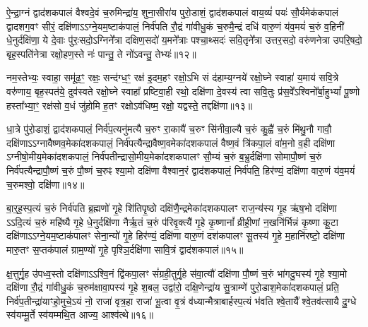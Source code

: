 {\anuvakamend[{सुभे॑षजमिहि॒ त्रीणि॑ च॥६॥}]}

ऐ॒न्द्रा॒ग्नं द्वाद॑शकपालं वैश्वदे॒वं च॒रुमिन्द्रा॑य॒ शुना॒सीरा॑य पुरो॒डाशं॒ द्वाद॑शकपालं वाय॒व्यं॑ पयः॑ सौ॒र्यमेक॑कपालं द्वादशग॒वꣳ सीरं॒ दक्षि॑णा\-ऽ\-ऽग्ने॒यम॒ष्टाक॑पालं॒ निर्व॑पति रौ॒द्रं गा॑वीधु॒कं च॒रुमै॒न्द्रं दधि॑ वारु॒णं य॑व॒मयं॑ च॒रुं व॒हिनी॑ धे॒नुर्दक्षि॑णा॒ ये दे॒वाः पु॑रः॒सदो॒\-ऽग्निने᳚त्रा दक्षिण॒सदो॑ य॒मने᳚त्राः पश्चा॒थ्सदः॑ सवि॒तृने᳚त्रा उत्तर॒सदो॒ वरु॑णनेत्रा उपरि॒षदो॒ बृह॒स्पति॑नेत्रा रक्षो॒हण॒स्ते नः॑ पान्तु॒ ते नो॑\-ऽवन्तु॒ तेभ्यः॑॥१२॥

नम॒स्तेभ्यः॒ स्वाहा॒ समू॑ढ॒ꣳ॒ रक्षः॒ सन्द॑ग्ध॒ꣳ॒ रक्ष॑ इ॒दम॒हꣳ रक्षो॒\-ऽभि सं द॑हाम्य॒ग्नये॑ रक्षो॒घ्ने स्वाहा॑ य॒माय॑ सवि॒त्रे वरु॑णाय॒ बृह॒स्पत॑ये॒ दुव॑स्वते रक्षो॒घ्ने स्वाहा᳚ प्रष्टिवा॒ही रथो॒ दक्षि॑णा दे॒वस्य॑ त्वा सवि॒तुः प्र॑स॒वे᳚\-ऽश्विनो᳚र्बा॒हु\-भ्यां᳚ पू॒ष्णो हस्ता᳚भ्या॒ꣳ॒ रक्ष॑सो व॒धं जु॑होमि ह॒तꣳ रक्षो\-ऽव॑धिष्म॒ रक्षो॒ यद्वस्ते॒ तद्दक्षि॑णा॥१३॥


{\anuvakamend[{तेभ्यः॒ पञ्च॑चत्वारिꣳशच्च॥७॥}]}

धा॒त्रे पु॑रो॒डाशं॒ द्वाद॑शकपालं॒ निर्व॑प॒त्यनु॑मत्यै च॒रुꣳ रा॒कायै॑ च॒रुꣳ सि॑नीवा॒ल्यै च॒रुं कु॒ह्वै॑ च॒रुं मि॑थु॒नौ गावौ॒ दक्षि॑णा\-ऽ\-ऽग्नावैष्णव॒मेका॑दशकपालं॒ निर्व॑पत्यैन्द्रावैष्ण॒वमेका॑दशकपालं वैष्ण॒वं त्रि॑कपा॒लं वा॑म॒नो व॒ही दक्षि॑णा \-ऽग्नीषो॒मीय॒मेका॑दशकपालं॒ निर्व॑पतीन्द्रासो॒मीय॒मेका॑दशकपालꣳ सौ॒म्यं च॒रुं ब॒भ्रुर्दक्षि॑णा सोमापौ॒ष्णं च॒रुं निर्व॑पत्यैन्द्रापौ॒ष्णं च॒रुं पौ॒ष्णं च॒रुꣴ श्या॒मो दक्षि॑णा वैश्वान॒रं द्वाद॑शकपालं॒ निर्व॑पति॒ हिर॑ण्यं॒ दक्षि॑णा वारु॒णं य॑व॒मयं॑ च॒रुमश्वो॒ दक्षि॑णा॥१४॥

{\anuvakamend[{निर॒ष्टौ च॥८॥}]}

बा॒र्॒\mbox{}ह॒स्प॒त्यं च॒रुं निर्व॑पति ब्र॒ह्मणो॑ गृ॒हे शि॑तिपृ॒ष्ठो दक्षि॑णै॒न्द्रमेका॑दशकपालꣳ राज॒न्य॑स्य गृ॒ह ऋ॑ष॒भो दक्षि॑णा \-ऽ\-ऽदि॒त्यं च॒रुं महि॑ष्यै गृ॒हे धे॒नुर्दक्षि॑णा नैर्\mbox{}ऋ॒तं च॒रुं प॑रिवृ॒क्त्यै॑ गृ॒हे कृ॒ष्णानां᳚ व्रीही॒णां न॒खनि॑र्भिन्नं कृ॒ष्णा कू॒टा दक्षि॑णा\-ऽ\-ऽग्ने॒यम॒ष्टाक॑पालꣳ सेना॒न्यो॑ गृ॒हे हिर॑ण्यं॒ दक्षि॑णा वारु॒णं दश॑कपालꣳ सू॒तस्य॑ गृ॒हे म॒हानि॑रष्टो॒ दक्षि॑णा मारु॒तꣳ स॒प्तक॑पालं ग्राम॒ण्यो॑ गृ॒हे पृश्ञि॒र्दक्षि॑णा सावि॒त्रं द्वाद॑शकपालं॥१५॥

क्ष॒त्तुर्गृ॒ह उ॑पध्व॒स्तो दक्षि॑णा\-ऽ\-ऽश्वि॒नं द्वि॑कपा॒लꣳ सं॑ग्रही॒तुर्गृ॒हे स॑वा॒त्यौ॑ दक्षि॑णा पौ॒ष्णं च॒रुं भा॑गदु॒घस्य॑ गृ॒हे श्या॒मो दक्षि॑णा रौ॒द्रं गा॑वीधु॒कं च॒रुम॑क्षावा॒पस्य॑ गृ॒हे श॒बल॒ उद्वा॑रो॒ दक्षि॒णेन्द्रा॑य सु॒त्राम्णे॑ पुरो॒डाश॒मेका॑दशकपालं॒ प्रति॒ निर्व॑प॒तीन्द्रा॑याꣳहो॒मुचे॒\-ऽयं नो॒ राजा॑ वृत्र॒हा राजा॑ भू॒त्वा वृ॒त्रं व॑ध्यान्मैत्राबार्\mbox{}हस्प॒त्यं भ॑वति श्वे॒तायै᳚ श्वे॒तव॑त्सायै दु॒ग्धे स्व॑यम्मू॒र्ते स्व॑यम्मथि॒त आज्य॒ आश्व॑त्थे॥१६॥

